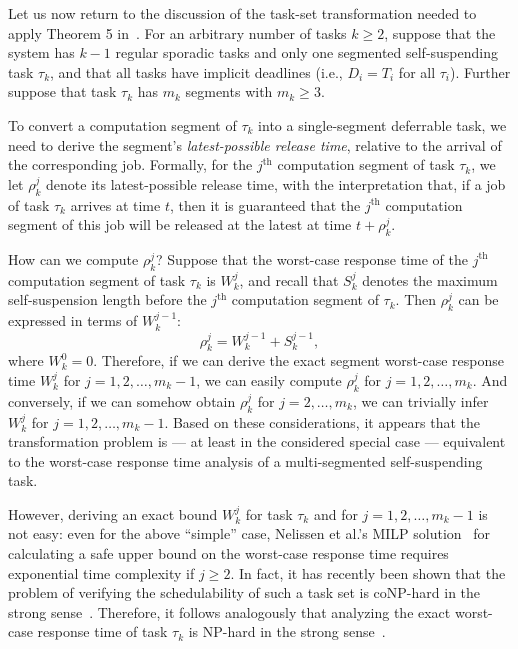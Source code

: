 Let us now return to the discussion of the task-set transformation needed to apply Theorem 5 in~\cite{Raj:suspension1991}. For an arbitrary number of tasks $k \geq 2$, 
suppose that the system has $k-1$ regular sporadic tasks and only one segmented self-suspending task $\tau_k$, and that all tasks have implicit deadlines (i.e., $D_i = T_i$ for all $\tau_i$). Further suppose that task $\tau_k$ has $m_k$ segments with $m_k \geq 3$.  

To  convert a computation segment of $\tau_k$ into a single-segment deferrable task, we need to derive the segment's \emph{latest-possible release time}, relative to the arrival of the corresponding job. Formally,  for the $j^{\mathrm{th}}$ computation segment of task $\tau_k$, we let $\rho_k^j$ denote its latest-possible release time, with the interpretation that, if a job of task $\tau_k$ arrives at time $t$, then  it is guaranteed that the $j^{\mathrm{th}}$ computation segment of this job will be released at the latest at time $t+\rho_k^j$.

How can we compute $\rho_k^j$? Suppose that the worst-case response time of the $j^{\mathrm{th}}$ computation segment of task $\tau_k$ is $W_k^j$, and recall that $S_k^{j}$ denotes the maximum self-suspension length before the $j^{\mathrm{th}}$ computation segment of $\tau_k$. Then $\rho_k^j$ can be expressed in terms of $W_k^{j-1}$:
$$
	\rho_k^j = W_k^{j-1}+S_k^{j-1},
$$
where $W_k^0 = 0$.  Therefore, if we can derive the exact segment worst-case response time $W_k^j$ for $j=1,2,\ldots,m_k-1$, we can easily compute $\rho_k^j$  for $j=1,2,\ldots,m_k$. And conversely, if we can somehow obtain $\rho_k^j$  for $j=2,\ldots,m_k$, we  can trivially infer $W_k^j$ for $j=1,2,\ldots,m_k-1$.
Based on these considerations, it appears that the transformation problem is  --- at least in the considered special case --- equivalent to the  worst-case response time analysis of a multi-segmented self-suspending task. 

However, deriving an exact bound $W_k^j$ for task $\tau_k$ and for $j=1,2,\ldots,m_k-1$ is not easy: 
even for the above ``simple'' case, Nelissen et al.'s MILP solution~\cite{ecrts15nelissen} for calculating a safe upper bound on the worst-case response time requires exponential time complexity if $j \geq 2$. In fact, it has recently been shown that the problem of verifying the schedulability of such a task set is coNP-hard in the strong sense~\cite{RTSS2016-suspension}. Therefore, it follows analogously that analyzing the exact worst-case response time of task $\tau_k$ is NP-hard in the strong sense~\cite{RTSS2016-suspension}.

